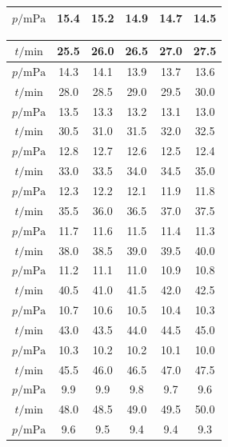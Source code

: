 \documentclass[a4paper,fontset=windows]{ctexart}
\begin{document}
\begin{center}
\begin{minipage}{0.45\textwidth}
\begin{tabular}{|c|c|c|c|c|c|}
            $p/\mathrm{mPa}$ & 15.4 & 15.2 & 14.9 & 14.7 & 14.5 \\
            \hline
        \end{tabular}
    \end{minipage}
    \begin{minipage}{0.45\textwidth}
        \begin{tabular}{|c|c|c|c|c|c|}
            \hline
            $t/\mathrm{min}$ & 25.5 & 26.0 & 26.5 & 27.0 & 27.5 \\
            \hline
            $p/\mathrm{mPa}$ & 14.3 & 14.1 & 13.9 & 13.7 & 13.6 \\
            \hline
            $t/\mathrm{min}$ & 28.0 & 28.5 & 29.0 & 29.5 & 30.0 \\
            \hline
            $p/\mathrm{mPa}$ & 13.5 & 13.3 & 13.2 & 13.1 & 13.0 \\
            \hline
            $t/\mathrm{min}$ & 30.5 & 31.0 & 31.5 & 32.0 & 32.5 \\
            \hline
            $p/\mathrm{mPa}$ & 12.8 & 12.7 & 12.6 & 12.5 & 12.4 \\
            \hline
            $t/\mathrm{min}$ & 33.0 & 33.5 & 34.0 & 34.5 & 35.0 \\
            \hline
            $p/\mathrm{mPa}$ & 12.3 & 12.2 & 12.1 & 11.9 & 11.8 \\
            \hline
            $t/\mathrm{min}$ & 35.5 & 36.0 & 36.5 & 37.0 & 37.5 \\
            \hline
            $p/\mathrm{mPa}$ & 11.7 & 11.6 & 11.5 & 11.4 & 11.3 \\
            \hline
            $t/\mathrm{min}$ & 38.0 & 38.5 & 39.0 & 39.5 & 40.0 \\
            \hline
            $p/\mathrm{mPa}$ & 11.2 & 11.1 & 11.0 & 10.9 & 10.8 \\
            \hline
            $t/\mathrm{min}$ & 40.5 & 41.0 & 41.5 & 42.0 & 42.5 \\
            \hline
            $p/\mathrm{mPa}$ & 10.7 & 10.6 & 10.5 & 10.4 & 10.3 \\
            \hline
            $t/\mathrm{min}$ & 43.0 & 43.5 & 44.0 & 44.5 & 45.0 \\
            \hline
            $p/\mathrm{mPa}$ & 10.3 & 10.2 & 10.2 & 10.1 & 10.0 \\
            \hline
            $t/\mathrm{min}$ & 45.5 & 46.0 & 46.5 & 47.0 & 47.5 \\
            \hline
            $p/\mathrm{mPa}$ & 9.9 & 9.9 & 9.8 & 9.7 & 9.6 \\
            \hline
            $t/\mathrm{min}$ & 48.0 & 48.5 & 49.0 & 49.5 & 50.0 \\
            \hline
            $p/\mathrm{mPa}$ & 9.6 & 9.5 & 9.4 & 9.4 & 9.3 \\
            \hline
        \end{tabular}
    \end{minipage}
    \end{center}
\end{document}
